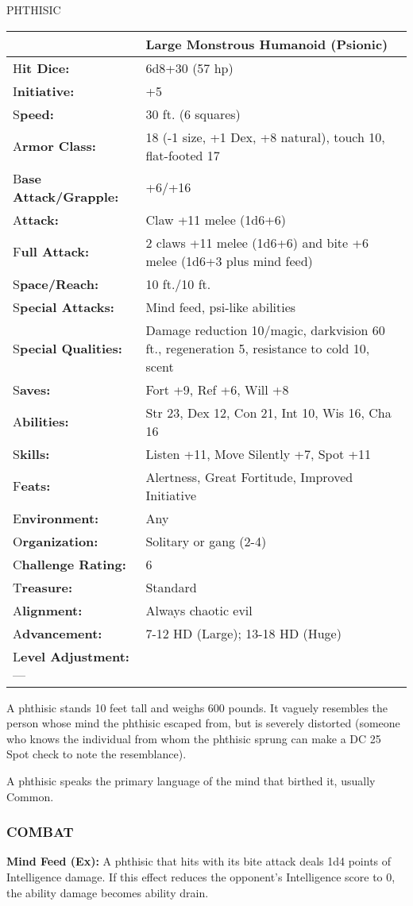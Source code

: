 \documentclass{article}
\begin{document}
\vspace{12pt}
{\LARGE{}PHTHISIC}

\begin{tabular}{|>{\raggedright}p{67pt}|>{\raggedright}p{258pt}|}
\hline
  & Large Monstrous Humanoid (Psionic)\tabularnewline
\hline
H\textbf{it Dice:} & 6d8+30 (57 hp)\tabularnewline
\hline
I\textbf{nitiative:} & +5\tabularnewline
\hline
S\textbf{peed:} & 30 ft. (6 squares)\tabularnewline
\hline
A\textbf{rmor Class:} & 18 (-1 size, +1 Dex, +8 natural), touch 10, flat-footed 
17\tabularnewline
\hline
B\textbf{ase Attack/Grapple:} & +6/+16\tabularnewline
\hline
A\textbf{ttack:} & Claw +11 melee (1d6+6)\tabularnewline
\hline
F\textbf{ull Attack:} & 2 claws +11 melee (1d6+6) and bite +6 melee (1d6+3 plus 
mind feed)\tabularnewline
\hline
S\textbf{pace/Reach:} & 10 ft./10 ft.\tabularnewline
\hline
S\textbf{pecial Attacks:} & Mind feed, psi-like abilities\tabularnewline
\hline
S\textbf{pecial Qualities:} & Damage reduction 10/magic, darkvision 60 ft., regeneration 
5, resistance to cold 10, scent\tabularnewline
\hline
S\textbf{aves:} & Fort +9, Ref +6, Will +8\tabularnewline
\hline
A\textbf{bilities:} & Str 23, Dex 12, Con 21, Int 10, Wis 16, Cha 16\tabularnewline
\hline
S\textbf{kills:} & Listen +11, Move Silently +7, Spot +11\tabularnewline
\hline
F\textbf{eats:} & Alertness, Great Fortitude, Improved Initiative\tabularnewline
\hline
E\textbf{nvironment:} & Any\tabularnewline
\hline
O\textbf{rganization:} & Solitary or gang (2-4)\tabularnewline
\hline
C\textbf{hallenge Rating:} & 6\tabularnewline
\hline
T\textbf{reasure:} & Standard\tabularnewline
\hline
A\textbf{lignment:} & Always chaotic evil\tabularnewline
\hline
A\textbf{dvancement:} & 7-12 HD (Large); 13-18 HD (Huge)\tabularnewline
\hline
L\textbf{evel Adjustment:}--- & \tabularnewline
\hline
\end{tabular}

A phthisic stands 10 feet tall and weighs 600 pounds. It vaguely resembles the 
person whose mind the phthisic escaped from, but is severely distorted (someone 
who knows the individual from whom the phthisic sprung can make a DC 25 Spot check 
to note the resemblance).

A phthisic speaks the primary language of the mind that birthed it, usually Common.

\subsubsection*{COMBAT}

\textbf{Mind Feed (Ex): }A phthisic that hits with its bite attack deals 1d4 points 
of Intelligence damage. If this effect reduces the opponent's Intelligence score 
to 0, the ability damage becomes ability drain.
\end{document}
